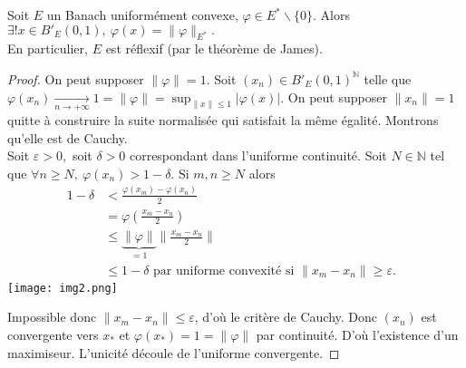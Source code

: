 \begin{propriete}
    Soit $E$ un Banach uniformément convexe, $\varphi \in E^* \backslash \{0\} .$ Alors $\exists !x\in B'_E(0,1),\ \varphi (x)=\|\varphi \|_{E^*}.$\\
    En particulier, $E$ est réflexif (par le théorème de James).
\end{propriete}
\begin{proof}
    On peut supposer $\|\varphi \|=1.$ Soit $(x_{n})\in B'_E(0,1)^\mathbb{N} $ telle que $\varphi (x_{n})\underset{n\to +\infty}{\longrightarrow} 1=\|\varphi \|=\sup_{\|x\|\le 1}|\varphi (x)|$. On peut supposer $\|x_n\|=1$ quitte à construire la suite normalisée qui satisfait la même égalité. Montrons qu'elle est de Cauchy.\\
    Soit $\varepsilon >0,$ soit $\delta>0$ correspondant dans l'uniforme continuité. Soit $N\in \mathbb{N} $ tel que $\forall n\ge N,\ \varphi (x_{n})>1-\delta. $ Si $m,n\ge N$ alors
    \begin{align*}
        1-\delta &<\frac{\varphi (x_{m})-\varphi (x_{n})}{2}\\
                 &=\varphi (\frac{x_{m}-x_{n}}{2})\\
                 &\le \underbrace{\|\varphi \|}_{=1}\|\frac{x_{m}-x_{n}}{2}\|\\
                 &\le 1-\delta \text{ par uniforme convexité si $\|x_m-x_n\|\ge \varepsilon .$ }
    \end{align*}
        \centering
        \texttt{[image: img2.png]}
 
    Impossible donc $\|x_m-x_n\|\le \varepsilon $, d'où le critère de Cauchy. Donc $(x_n)$ est convergente vers $x_*$ et $\varphi (x_*)=1=\|\varphi \|$ par continuité. D'où l'existence d'un maximiseur. L'unicité découle de l'uniforme convergente.
\end{proof}

